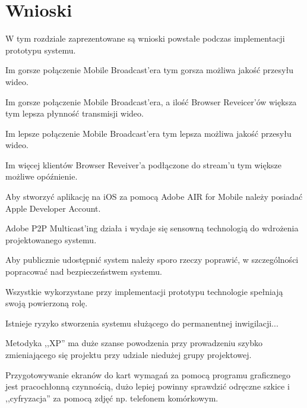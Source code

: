 \newpage
\section{Wnioski}

W tym rozdziale zaprezentowane są wnioski powstałe podczas implementacji prototypu systemu.

\begin{packed_item}
    \item{Im gorsze połączenie Mobile Broadcast'era tym gorsza możliwa jakość przesyłu wideo.}
    \item{Im gorsze połączenie Mobile Broadcast'era, a ilość Browser Reveicer'ów większa tym lepsza płynność transmisji wideo.}
    \item{Im lepsze połączenie Mobile Broadcast'era tym lepsza możliwa jakość przesyłu wideo.}
    \item{Im więcej klientów Browser Reveiver'a podłączone do stream'u tym większe możliwe opóźnienie.}
    \item{Aby stworzyć aplikację na iOS za pomocą Adobe AIR for Mobile należy posiadać Apple Developer Account.}
    \item{Adobe P2P Multicast'ing działa i wydaje się sensowną technologią do wdrożenia projektowanego systemu.}
    \item{Aby publicznie udostępnić system należy sporo rzeczy poprawić, w szczególności popracować nad bezpieczeństwem systemu.}
    \item{Wszystkie wykorzystane przy implementacji prototypu technologie spełniają swoją powierzoną rolę.}
    \item{Istnieje ryzyko stworzenia systemu służącego do permanentnej inwigilacji...}
    \item{Metodyka ,,XP'' ma duże szanse powodzenia przy prowadzeniu szybko zmieniającego się projektu przy udziale niedużej grupy projektowej.}
    \item{Przygotowywanie ekranów do kart wymagań za pomocą programu graficznego jest pracochłonną czynnością, dużo lepiej powinny sprawdzić odręczne szkice i ,,cyfryzacja'' za pomocą zdjęć np. telefonem komórkowym.}
\end{packed_item}

\newpage
